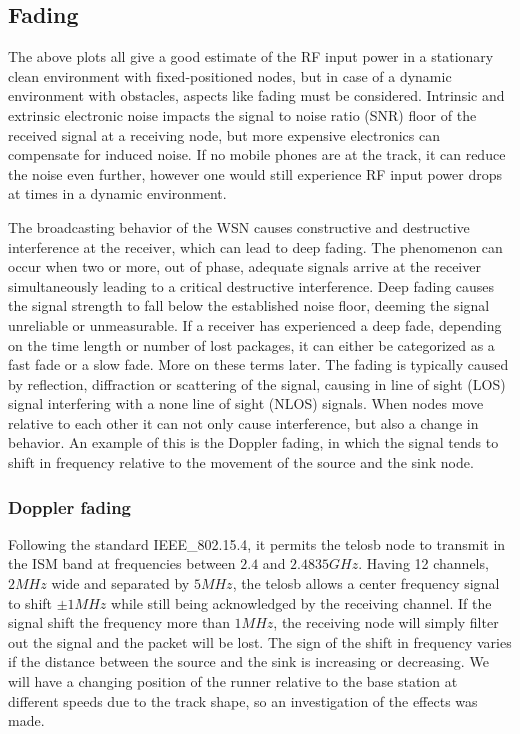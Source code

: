 \subsection{Fading}\label{sc:fading}

The above plots all give a good estimate of the RF input power in a stationary clean environment with fixed-positioned nodes, but in case of a dynamic environment with obstacles, aspects like fading must be considered. Intrinsic and extrinsic electronic noise impacts the signal to noise ratio (SNR) floor of the received signal at a receiving node, but more expensive electronics can compensate for induced noise. If no mobile phones are at the track, it can reduce the noise even further, however one would still experience RF input power drops at times in a dynamic environment.

\noindent The broadcasting behavior of the WSN causes constructive and destructive interference at the receiver, which can lead to deep fading. The phenomenon can occur when two or more, out of phase, adequate signals arrive at the receiver simultaneously leading to a critical destructive interference. Deep fading causes the signal strength to fall below the established noise floor, deeming the signal unreliable or unmeasurable. If a receiver has experienced a deep fade, depending on the time length or number of lost packages, it can either be categorized as a fast fade or a slow fade. More on these terms later. The fading is typically caused by reflection, diffraction or scattering of the signal, causing in line of sight (LOS) signal interfering with a none line of sight (NLOS) signals. When nodes move relative to each other it can not only cause interference, but also a change in behavior. An example of this is the Doppler fading, in which the signal tends to shift in frequency relative to the movement of the source and the sink node.

\subsubsection{Doppler fading}
Following the standard IEEE\_802.15.4, it permits the telosb node to transmit in the ISM band at frequencies between $2.4$ and $2.4835 GHz$. Having 12 channels, $2 MHz$ wide and separated by $5 MHz$, the telosb allows a center frequency signal to shift $\pm 1 MHz$ while still being acknowledged by the receiving channel. If the signal shift the frequency more than $1 MHz$, the receiving node will simply filter out the signal and the packet will be lost. The sign of the shift in frequency varies if the distance between the source and the sink is increasing or decreasing. We will have a changing position of the runner relative to the base station at different speeds due to the track shape, so an investigation of the effects was made.

